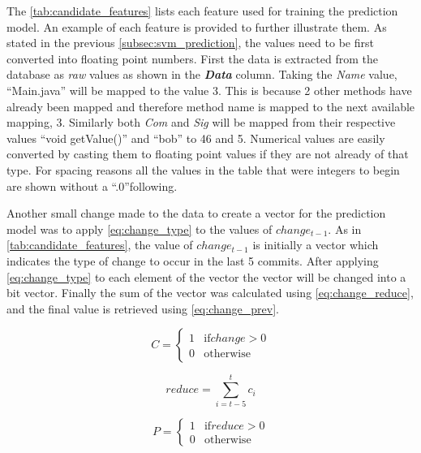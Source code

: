 The \autoref{tab:candidate_features} lists each feature used for training the prediction model. An example of each feature is provided to further illustrate them. As stated in the previous \autoref{subsec:svm_prediction}, the values need to be first converted into floating point numbers. First the data is extracted from the database as \textit{raw} values as shown in the \textit{\textbf{Data}} column. Taking the \textit{Name} value, ``Main.java'' will be mapped to the value 3. This is because 2 other methods have already been mapped and therefore method name is mapped to the next available mapping, 3. Similarly both \textit{Com} and \textit{Sig} will be mapped from their respective values ``void getValue()'' and ``bob'' to 46 and 5. Numerical values are easily converted by casting them to floating point values if they are not already of that type. For spacing reasons all the values in the table that were integers to begin are shown without a ``.0''following.

Another small change made to the data to create a vector for the prediction model was to apply \autoref{eq:change_type} to the values of $change_{t-1}$. As in \autoref{tab:candidate_features}, the value of $change_{t-1}$ is initially a vector which indicates the type of change to occur in the last 5 commits. After applying \autoref{eq:change_type} to each element of the vector the vector will be changed into a bit vector. Finally the sum of the vector was calculated using \autoref{eq:change_reduce}, and the final value is retrieved using \autoref{eq:change_prev}.

\begin{equation} 
\label{eq:change_type}
C = \left\{\begin{matrix}
1 & \text{if} change > 0 \\
0 & \text{otherwise}
\end{matrix}\right.
\end{equation}

\begin{equation} 
\label{eq:change_reduce}
reduce = \sum_{i=t-5}^{t}{c_i}
\end{equation}

\begin{equation} 
\label{eq:change_prev}
P = \left\{\begin{matrix}
1 & \text{if} reduce > 0 \\
0 & \text{otherwise}
\end{matrix}\right.
\end{equation}

